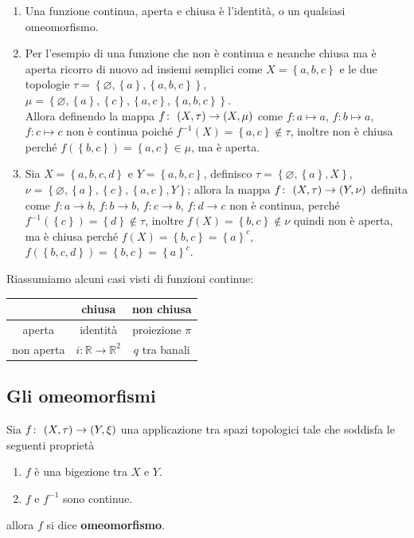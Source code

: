 \begin{example}
\begin{enumerate}
	\item Una funzione continua, aperta e chiusa è l'identità, o un qualsiasi omeomorfismo.
	\item Per l'esempio di una funzione che non è continua e neanche chiusa ma è aperta ricorro di nuovo ad insiemi semplici come $X = \left\{a,b,c\right\}$ e le due topologie $\tau = \left\{\varnothing, \left\{a\right\},\left\{a,b,c\right\}\right\}$, $\mu = \left\{\varnothing, \left\{a\right\}, \left\{c\right\}, \left\{a,c\right\}, \left\{a,b,c\right\}\right\}$. \\ Allora definendo la mappa $f \colon\ (X,\tau) \rightarrow (X,\mu)$ come $f \colon a \mapsto a$, $f \colon b \mapsto a$, $f \colon c \mapsto c$ non è continua poiché $f^{-1}(X) = \left\{a,c\right\} \notin \tau$, inoltre non è chiusa perché $f(\left\{b,c\right\}) = \left\{a,c\right\} \in \mu$, ma è aperta.\\
	\item Sia $X = \left\{a,b,c,d\right\}$  e $Y = \left\{a,b,c\right\}$, definisco $\tau = \left\{\varnothing, \left\{a\right\}, X\right\}$, $\nu = \left\{\varnothing, \left\{a\right\}, \left\{c\right\}, \left\{a,c\right\}, Y\right\}$; allora la mappa $f \colon\ (X,\tau) \rightarrow (Y,\nu)$ definita come $f \colon a \rightarrow b$,  $f \colon b \rightarrow b$, $f \colon c \rightarrow b$, $f \colon d \rightarrow c$ non è continua, perché $f^{-1}(\left\{c\right\}) = \left\{d\right\} \notin \tau$, inoltre $f(X) = \left\{b,c\right\} \notin \nu$ quindi non è aperta, ma è chiusa perché $f(X) = \left\{b,c\right\} = \left\{a\right\}^c$, $f(\left\{b,c,d\right\}) = \left\{b,c\right\} = \left\{a\right\}^c$.   
\end{enumerate}
Riassumiamo alcuni casi visti di funzioni continue:
\begin{tabular}{c | c | c}
	& chiusa & non chiusa \\
	\hline
	aperta & identità & proiezione $\pi$\\
	non aperta & $i:\mathbb{R}\to\mathbb{R}^2$ & $q$ tra banali \\
\end{tabular}
\end{example}



\subsection{\textcolor{TopGener}{\textbf{Gli omeomorfismi}}}



\begin{definition}
	Sia $f \colon\ (X,\tau) \rightarrow (Y,\xi)$ una applicazione tra spazi topologici tale che soddisfa le seguenti proprietà
	\begin{enumerate}
		\item $f$ è una bigezione tra $X$ e $Y$.
		\item $f$ e $f^{-1}$ sono continue.
	\end{enumerate} 
	allora $f$ si dice \textbf{omeomorfismo}. 
\end{definition}


